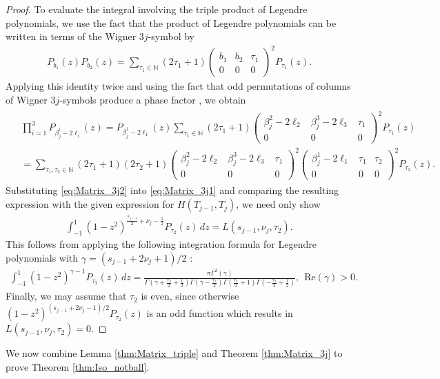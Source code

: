 \documentclass[11pt]{amsart}
\theoremstyle{definition}
\theoremstyle{plain}
\theoremstyle{remark}
\newcommand{\N}{\mathbb{N}}
\newcommand{\mat}[6]{\begin{pmatrix} #1 & #2 & #3 \\ #4 & #5 & #6 \end{pmatrix}}
\begin{document}
\begin{proof}
To evaluate the integral involving the triple product of Legendre polynomials, we use the fact that the product of Legendre polynomials can be written in terms of the Wigner $3j$-symbol by \cite[Eq.~34.3.19]{NIST} 
\begin{align*} 
P_{b_1}(z)P_{b_2}(z) = \sum_{\tau_1\in\N} (2\tau_1 + 1)\mat{b_1}{b_2}{\tau_1}{0}{0}{0}^2P_{\tau_1}(z). 
\end{align*} 
Applying this identity twice and using the fact that odd permutations of columns of Wigner $3j$-symbols produce a phase factor \cite[Eq.~34.3.9]{NIST}, we obtain 
\begin{gather} \label{eq:Matrix_3j2} 
\begin{aligned} 
& \prod_{i = 1}^3 P_{\beta_j^i - 2\ell_i}(z) = P_{\beta_j^1 - 2\ell_1}(z) \sum_{\tau_1\in\N} (2\tau_1 + 1)\mat{\beta_j^2 - 2\ell_2}{\beta_j^3 - 2\ell_3}{\tau_1}{0}{0}{0}^2 P_{\tau_1}(z) \\ 
& = \sum_{\tau_1, \tau_2\in\N} (2\tau_1 + 1)(2\tau_2 + 1)\mat{\beta_j^2 - 2\ell_2}{\beta_j^3 - 2\ell_3}{\tau_1}{0}{0}{0}^2\mat{\beta_j^1 - 2\ell_1}{\tau_1}{\tau_2}{0}{0}{0}^2 P_{\tau_2}(z). 
\end{aligned} 
\end{gather} 
Substituting \eqref{eq:Matrix_3j2} into \eqref{eq:Matrix_3j1} and comparing the resulting expression with the given expression for $H(T_{j - 1}, T_j)$, we need only show  
\begin{align*} 
\int_{-1}^1 (1 - z^2)^{\frac{s_{j - 1}}{2} + \nu_j - \frac{1}{2}}P_{\tau_2}(z)\, dz = L(s_{j - 1}, \nu_j, \tau_2). 
\end{align*} 
This follows from applying the following integration formula for Legendre polynomials with $\gamma = (s_{j - 1} + 2\nu_j + 1)/2$ \cite[Eq.~7.132.1 with $\mu = 0$]{Gradshteyn}:  
\begin{align*} 
\int_{-1}^1 (1 - z^2)^{\gamma - 1}P_{\tau_2}(z)\, dz = \frac{\pi\Gamma^2(\gamma)}{\Gamma\left(\gamma + \frac{\tau_2}{2} + \frac{1}{2}\right)\Gamma\left(\gamma - \frac{\tau_2}{2}\right)\Gamma\left(\frac{\tau_2}{2} + 1\right)\Gamma\left(-\frac{\tau_2}{2} + \frac{1}{2}\right)}, \ \ \mathrm{Re}(\gamma) > 0. 
\end{align*} 
Finally, we may assume that $\tau_2$ is even, since otherwise $(1 - z^2)^{(s_{j - 1} + 2\nu_j - 1)/2}P_{\tau_2}(z)$ is an odd function which results in $L(s_{j - 1}, \nu_j, \tau_2) = 0$. 
\end{proof} 

We now combine Lemma \ref{thm:Matrix_triple} and Theorem \ref{thm:Matrix_3j} to prove Theorem \ref{thm:Iso_notball}. 
\end{document}
